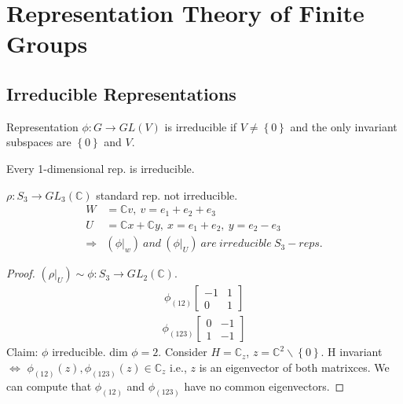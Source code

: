 \documentclass[../../note.tex]{subfiles}
\begin{document}
\chapter{Representation Theory of Finite Groups}
\section{Irreducible Representations}
\begin{definition}
    Representation $\phi: G \rightarrow GL(V)$ is irreducible if $V \neq \left\{ 0 \right\}$ and the only invariant subspaces are $\left\{ 0 \right\}$ and $V$.
\end{definition}
\begin{example}
    Every 1-dimensional rep. is irreducible.
\end{example}

\begin{example}
    $\rho: S_3 \rightarrow GL_3(\mathbb{C})$ standard rep. not irreducible.
    \begin{align}
        W &= \mathbb{C}v,~v = e_1 +e_2+e_3 \\
        U &= \mathbb{C}x + \mathbb{C}y,~x=e_1+e_2,~y=e_2-e_3 \\
        \Longrightarrow &(\phi \vert_w)~and~(\phi \vert_U)~are~irreducible~S_3-reps.
    \end{align}
\end{example}
\begin{proof}
    $(\rho \vert_U) \sim \phi: S_3 \rightarrow GL_2(\mathbb{C})$.
    \begin{align}
        \phi_{(12)}\left[\begin{matrix}
            -1&1\\
            0&1
        \end{matrix}\right]
    \end{align}
    \begin{align}
        \phi_{(123)}\left[\begin{matrix}
            0&-1\\
            1&-1
        \end{matrix}\right]
    \end{align}
    Claim: $\phi$ irreducible. dim $\phi = 2$. Consider $H = \mathbb{C}_z$, $z = \mathbb{C}^2 \backslash \left\{0\right\}$. H invariant $\Longleftrightarrow$ $\phi_{(12)}(z), \phi_{(123)}(z) \in \mathbb{C}_z$ i.e., $z$ is an eigenvector of both matrixces. We can compute that $\phi_{(12)}$ and $\phi_{(123)}$ have no common eigenvectors.
\end{proof}
\end{document}
